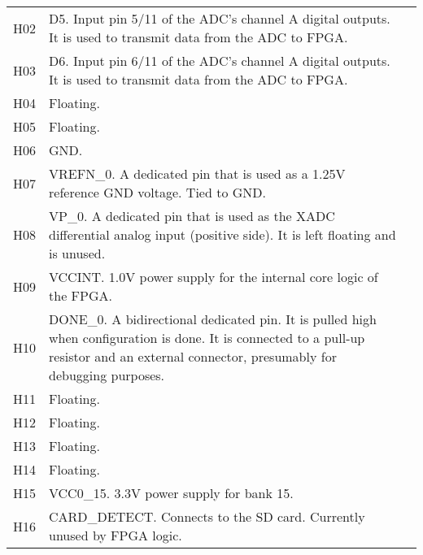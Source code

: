 \begin{tabularx}{\textwidth}{c X>{\raggedright\arraybackslash}X}
        H02 & D5. Input pin 5/11 of the ADC's channel A digital outputs. It is used to transmit data from
        the ADC to FPGA. \\
        H03 & D6. Input pin 6/11 of the ADC's channel A digital outputs. It is used to transmit data from
        the ADC to FPGA. \\
        H04 & Floating. \\
        H05 & Floating. \\
        H06 & GND\@. \\
        H07 & VREFN\_0. A dedicated pin that is used as a 1.25V reference GND voltage. Tied to GND\@. \\
        H08 & VP\_0. A dedicated pin that is used as the XADC differential analog input (positive side). It
        is left floating and is unused. \\
        H09 & VCCINT. 1.0V power supply for the internal core logic of the FPGA. \\
        H10 & DONE\_0. A bidirectional dedicated pin. It is pulled high when configuration is done. It
        is connected to a pull-up resistor and an external connector, presumably for debugging purposes. \\
        H11 & Floating. \\
        H12 & Floating. \\
        H13 & Floating. \\
        H14 & Floating. \\
        H15 & VCC0\_15. 3.3V power supply for bank 15. \\
        H16 & CARD\_DETECT. Connects to the SD card. Currently unused by FPGA logic. \\

        \midrule


\end{tabularx}
